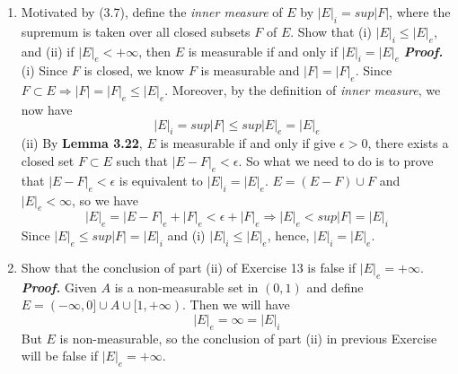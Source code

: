 \documentclass[a4paper,11pt]{article}
\begin{document}
\begin{enumerate}
\item Motivated by (3.7), define the \textit{inner measure} of $E$ by $\left| E \right|_i = sup\left| F \right|$, where the supremum is taken over all closed subsets $F$ of $E$. Show that (i) $\left| E \right|_i \leq \left| E \right|_e$, and (ii) if $\left| E \right|_e < +\infty$, then $E$ is measurable if and only if $\left| E \right|_i = \left| E \right|_e$
\newline
\newline
\textit{\textbf {Proof.}}
\newline
(i)
\newline
Since $F$ is closed, we know $F$ is measurable and $|F| = |F|_e$.
\newline
Since $F \subset E \Rightarrow |F| = |F|_e \leq |E|_e$.
\newline
Moreover, by the definition of \textit{inner measure}, we now have
$$|E|_i = sup|F| \leq sup |E|_e = |E|_e$$
\newline
\newline
(ii)
\newline
By \textbf {Lemma 3.22}, $E$ is measurable if and only if give $\epsilon > 0$, there exists a closed set $F \subset E$ such that $|E - F|_e < \epsilon$.
\newline
\newline
So what we need to do is to prove that $|E - F|_e < \epsilon$ is equivalent to $|E|_i = |E|_e$.
\newline
\newline
$E = (E - F) \cup F$ and $|E|_e < \infty$, so we have
$$|E|_e = |E-F|_e + |F|_e < \epsilon + |F|_e \Rightarrow |E|_e < sup |F| = |E|_i$$
Since $|E|_e \leq sup |F| = |E|_i$ and (i) $|E|_i \leq |E|_e$, hence, $|E|_i = |E|_e$.
\newline
\newline


\item Show that the conclusion of part (ii) of Exercise 13 is false if $\left| E \right|_e = +\infty$.
\newline
\newline
\textit{\textbf {Proof.}}
\newline
Given $A$ is a non-measurable set in $(0,1)$ and define $E = (-\infty, 0] \cup A \cup [1, +\infty)$.
\newline
Then we will have
$$|E|_e = \infty = |E|_i$$
But $E$ is non-measurable, so the conclusion of part (ii) in previous Exercise will be false if $|E|_e = +\infty$.
\newline
\newline



\end{enumerate}
\end{document}
